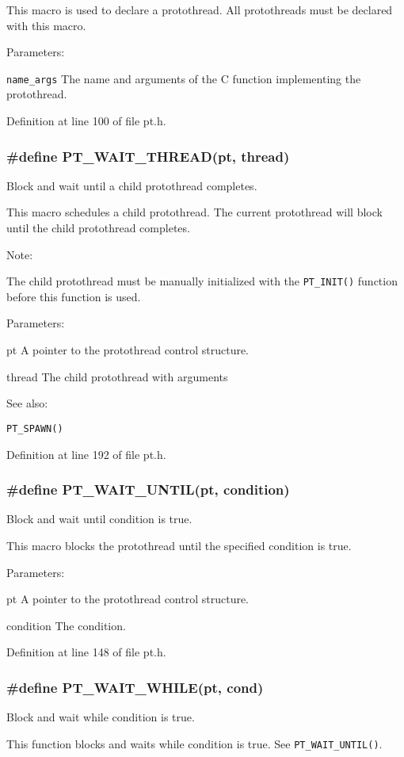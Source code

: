 \documentclass[12pt]{article}
\begin{document}
\begin{CJK}{UTF8}{bsmi}
This macro is used to declare a protothread. All protothreads must be declared with this macro.

Parameters:

\verb+name_args+ The name and arguments of the C function implementing the protothread.

Definition at line 100 of file pt.h.

\subsubsection{\#define PT\_WAIT\_THREAD(pt, thread)}

Block and wait until a child protothread completes.

This macro schedules a child protothread. The current protothread will block until the child protothread completes.

Note:

The child protothread must be manually initialized with the \verb+PT_INIT()+ function before this function is used.

Parameters:

pt A pointer to the protothread control structure.

thread The child protothread with arguments

See also:

\verb+PT_SPAWN()+

Definition at line 192 of file pt.h.

\subsubsection{\#define PT\_WAIT\_UNTIL(pt, condition)}

Block and wait until condition is true.

This macro blocks the protothread until the specified condition is true.

Parameters:

pt A pointer to the protothread control structure.

condition The condition.

Definition at line 148 of file pt.h.


\subsubsection{\#define PT\_WAIT\_WHILE(pt, cond)}

Block and wait while condition is true.

This function blocks and waits while condition is true. See \verb+PT_WAIT_UNTIL()+.


\end{CJK}
\end{document}

